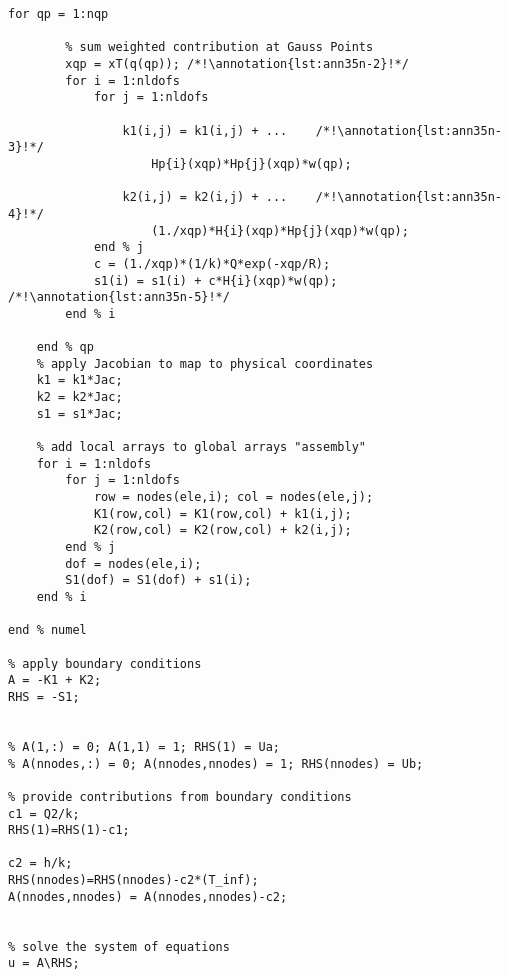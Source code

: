\begin{lstlisting}[style=myMatlab,name=lec35n-ex]
    for qp = 1:nqp
        
        % sum weighted contribution at Gauss Points
        xqp = xT(q(qp)); /*!\annotation{lst:ann35n-2}!*/
        for i = 1:nldofs
            for j = 1:nldofs
                
                k1(i,j) = k1(i,j) + ...    /*!\annotation{lst:ann35n-3}!*/
                    Hp{i}(xqp)*Hp{j}(xqp)*w(qp);
                                
                k2(i,j) = k2(i,j) + ...    /*!\annotation{lst:ann35n-4}!*/
                    (1./xqp)*H{i}(xqp)*Hp{j}(xqp)*w(qp);
            end % j
            c = (1./xqp)*(1/k)*Q*exp(-xqp/R);
            s1(i) = s1(i) + c*H{i}(xqp)*w(qp);  /*!\annotation{lst:ann35n-5}!*/
        end % i
     
    end % qp
    % apply Jacobian to map to physical coordinates
    k1 = k1*Jac;
    k2 = k2*Jac;
    s1 = s1*Jac;

    % add local arrays to global arrays "assembly"
    for i = 1:nldofs
        for j = 1:nldofs
            row = nodes(ele,i); col = nodes(ele,j);
            K1(row,col) = K1(row,col) + k1(i,j);
            K2(row,col) = K2(row,col) + k2(i,j);
        end % j
        dof = nodes(ele,i);
        S1(dof) = S1(dof) + s1(i);
    end % i

end % numel

% apply boundary conditions
A = -K1 + K2;
RHS = -S1;


% A(1,:) = 0; A(1,1) = 1; RHS(1) = Ua;
% A(nnodes,:) = 0; A(nnodes,nnodes) = 1; RHS(nnodes) = Ub;

% provide contributions from boundary conditions
c1 = Q2/k;
RHS(1)=RHS(1)-c1;

c2 = h/k;
RHS(nnodes)=RHS(nnodes)-c2*(T_inf);
A(nnodes,nnodes) = A(nnodes,nnodes)-c2;


% solve the system of equations
u = A\RHS;
\end{lstlisting}



